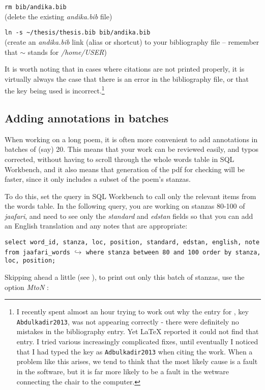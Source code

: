 \verb|rm bib/andika.bib|\\
(delete the existing \textit{andika.bib} file)

\verb|ln -s ~/thesis/thesis.bib bib/andika.bib|\\
(create an \textit{andika.bib} link (alias or shortcut) to your bibliography file -- remember that $\sim$ stands for \textit{/home/USER})

It is worth noting that in cases where citations are not printed properly, it is virtually always the case that there is an error in the bibliography file, or that the key being used is incorrect.\footnote{I recently spent almost an hour trying to work out why the entry for \citet{Abdulkadir2013}, key \texttt{Abdulkadir2013}, was not appearing correctly - there were definitely no mistakes in the bibliography entry.  Yet LaTeX reported it could not find that entry.  I tried various increasingly complicated fixes, until eventually I noticed that I had typed the key as \texttt{Adbulkadir2013} when citing the work.  When a problem like this arises, we tend to think that the most likely cause is a fault in the software, but it is far more likely to be a fault in the wetware connecting the chair to the computer.}

\subsection{Adding annotations in batches}

When working on a long poem, it is often more convenient to add annotations in batches of (say) 20.  This means that your work can be reviewed easily, and typos corrected, without having to scroll through the whole words table in SQL Workbench, and it also means that generation of the pdf for checking will be faster, since it only includes a subset of the poem's stanzas.

To do this, set the query in SQL Workbench to call only the relevant items from the words table.  In the following query, you are working on stanzas 80-100 of \textit{jaafari}, and need to see only the \textit{standard} and \textit{edstan} fields so that you can add an English translation and any notes that are appropriate:

\verb|select word_id, stanza, loc, position, standard, edstan, english, note from jaafari_words|
$\hookrightarrow$ \verb|where stanza between 80 and 100 order by stanza, loc, position;|

Skipping ahead a little (see ), to print out only this batch of stanzas, use the option \textit{MtoN} :

